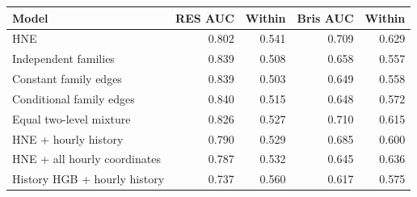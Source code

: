 \begin{tabular}{lrrrr}
\toprule
Model & RES AUC & Within & Bris AUC & Within \\
\midrule
HNE & 0.802 & 0.541 & 0.709 & 0.629 \\
Independent families & 0.839 & 0.508 & 0.658 & 0.557 \\
Constant family edges & 0.839 & 0.503 & 0.649 & 0.558 \\
Conditional family edges & 0.840 & 0.515 & 0.648 & 0.572 \\
Equal two-level mixture & 0.826 & 0.527 & 0.710 & 0.615 \\
HNE + hourly history & 0.790 & 0.529 & 0.685 & 0.600 \\
HNE + all hourly coordinates & 0.787 & 0.532 & 0.645 & 0.636 \\
History HGB + hourly history & 0.737 & 0.560 & 0.617 & 0.575 \\
\bottomrule
\end{tabular}